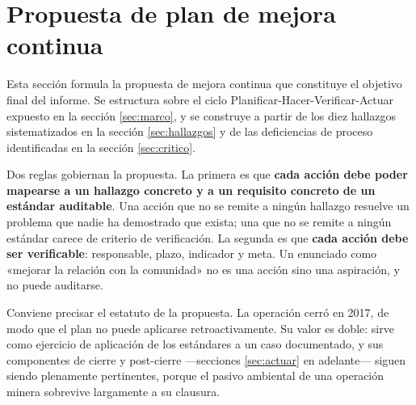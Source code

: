 %
%
%

\section{Propuesta de plan de mejora continua}
\label{sec:plan}

Esta sección formula la propuesta de mejora continua que constituye el objetivo
final del informe. Se estructura sobre el ciclo Planificar-Hacer-Verificar-Actuar
expuesto en la sección \ref{sec:marco}, y se construye a partir de los diez
hallazgos sistematizados en la sección \ref{sec:hallazgos} y de las deficiencias
de proceso identificadas en la sección \ref{sec:critico}.

Dos reglas gobiernan la propuesta. La primera es que \textbf{cada acción debe
poder mapearse a un hallazgo concreto y a un requisito concreto de un estándar
auditable}. Una acción que no se remite a ningún hallazgo resuelve un problema
que nadie ha demostrado que exista; una que no se remite a ningún estándar carece
de criterio de verificación. La segunda es que \textbf{cada acción debe ser
verificable}: responsable, plazo, indicador y meta. Un enunciado como «mejorar la
relación con la comunidad» no es una acción sino una aspiración, y no puede
auditarse.

Conviene precisar el estatuto de la propuesta. La operación cerró en 2017, de modo
que el plan no puede aplicarse retroactivamente. Su valor es doble: sirve como
ejercicio de aplicación de los estándares a un caso documentado, y sus componentes
de cierre y post-cierre —secciones \ref{sec:actuar} en adelante— siguen siendo
plenamente pertinentes, porque el pasivo ambiental de una operación minera
sobrevive largamente a su clausura.

